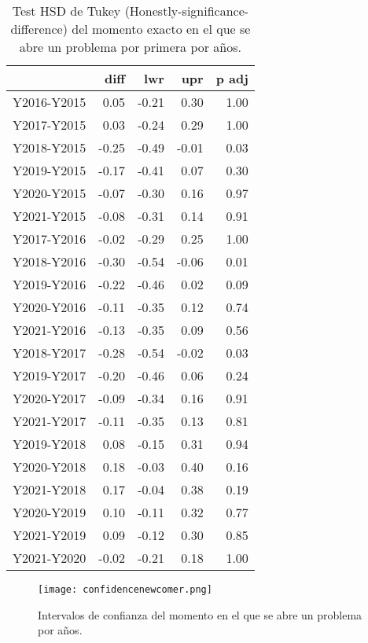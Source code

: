 \begin{table}[H]
\centering
\caption{Test HSD de Tukey (Honestly-significance-difference) del momento exacto en el que se abre un problema por primera por años.}
\label{tab:Tukeynewcomer}
\begin{tabular}{rrrrr}
  \hline
 & diff & lwr & upr & p adj \\ 
  \hline
Y2016-Y2015 & 0.05 & -0.21 & 0.30 & 1.00 \\ 
  Y2017-Y2015 & 0.03 & -0.24 & 0.29 & 1.00 \\ 
  Y2018-Y2015 & -0.25 & -0.49 & -0.01 & 0.03 \\ 
  Y2019-Y2015 & -0.17 & -0.41 & 0.07 & 0.30 \\ 
  Y2020-Y2015 & -0.07 & -0.30 & 0.16 & 0.97 \\ 
  Y2021-Y2015 & -0.08 & -0.31 & 0.14 & 0.91 \\ 
  Y2017-Y2016 & -0.02 & -0.29 & 0.25 & 1.00 \\ 
  Y2018-Y2016 & -0.30 & -0.54 & -0.06 & 0.01 \\ 
  Y2019-Y2016 & -0.22 & -0.46 & 0.02 & 0.09 \\ 
  Y2020-Y2016 & -0.11 & -0.35 & 0.12 & 0.74 \\ 
  Y2021-Y2016 & -0.13 & -0.35 & 0.09 & 0.56 \\ 
  Y2018-Y2017 & -0.28 & -0.54 & -0.02 & 0.03 \\ 
  Y2019-Y2017 & -0.20 & -0.46 & 0.06 & 0.24 \\ 
  Y2020-Y2017 & -0.09 & -0.34 & 0.16 & 0.91 \\ 
  Y2021-Y2017 & -0.11 & -0.35 & 0.13 & 0.81 \\ 
  Y2019-Y2018 & 0.08 & -0.15 & 0.31 & 0.94 \\ 
  Y2020-Y2018 & 0.18 & -0.03 & 0.40 & 0.16 \\ 
  Y2021-Y2018 & 0.17 & -0.04 & 0.38 & 0.19 \\ 
  Y2020-Y2019 & 0.10 & -0.11 & 0.32 & 0.77 \\ 
  Y2021-Y2019 & 0.09 & -0.12 & 0.30 & 0.85 \\ 
  Y2021-Y2020 & -0.02 & -0.21 & 0.18 & 1.00 \\ 
   \hline
\end{tabular}
\end{table}

\begin{figure}[H]
    \centering
    \texttt{[image: confidencenewcomer.png]}
    \caption{Intervalos de confianza del momento en el que se abre un problema por años.}
    \label{fig:confidencenewcomer}
\end{figure}


